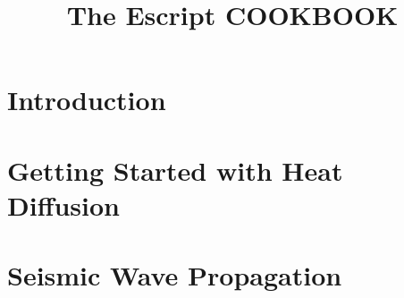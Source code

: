 \documentclass{manual}
\title{The Escript COOKBOOK}
\begin{document}
\chapter{Introduction}


\chapter{Getting Started with Heat Diffusion}




\chapter{Seismic Wave Propagation}

\end{document}
